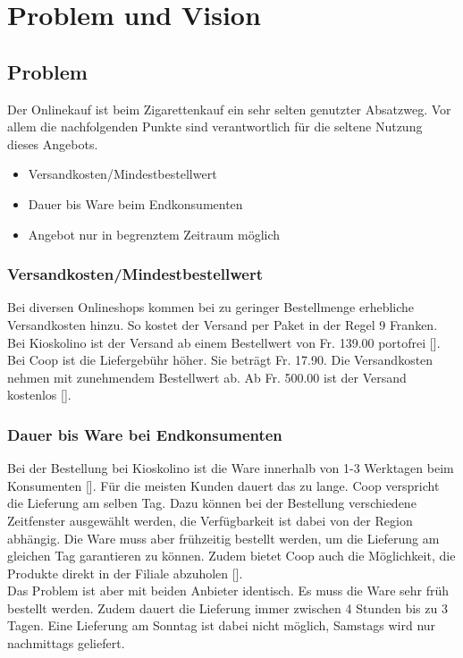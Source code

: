 \section{Problem und Vision}\label{Problem}
\subsection{Problem}
Der Onlinekauf ist beim Zigarettenkauf ein sehr selten genutzter Absatzweg. Vor allem die nachfolgenden Punkte sind verantwortlich für die seltene Nutzung dieses Angebots. 
\begin{itemize}
	\item Versandkosten/Mindestbestellwert
	\item Dauer bis Ware beim Endkonsumenten
	\item Angebot nur in begrenztem Zeitraum möglich
\end{itemize}

\subsubsection{Versandkosten/Mindestbestellwert}
Bei diversen Onlineshops kommen bei zu geringer Bestellmenge erhebliche Versandkosten hinzu. So kostet der Versand per Paket in der Regel 9 Franken. Bei Kioskolino ist der Versand ab einem Bestellwert von Fr. 139.00 portofrei [\cite{kioskolino}]. 
Bei Coop ist die Liefergebühr höher. Sie beträgt Fr. 17.90. Die Versandkosten nehmen mit zunehmendem Bestellwert ab. Ab Fr. 500.00 ist der Versand kostenlos [\cite{coop}]. 
\subsubsection{Dauer bis Ware bei Endkonsumenten}
Bei der Bestellung bei Kioskolino ist die Ware innerhalb von 1-3 Werktagen beim Konsumenten [\cite{kioskolino}]. Für die meisten Kunden dauert das zu lange. 
Coop verspricht die Lieferung am selben Tag. Dazu können bei der Bestellung verschiedene Zeitfenster ausgewählt werden, die Verfügbarkeit ist dabei von der Region abhängig. Die Ware muss aber frühzeitig bestellt werden, um die Lieferung am gleichen Tag garantieren zu können. Zudem bietet Coop auch die Möglichkeit, die Produkte direkt in der Filiale abzuholen [\cite{coop}].\\
Das Problem ist aber mit beiden Anbieter identisch. Es muss die Ware sehr früh bestellt werden. Zudem dauert die Lieferung immer zwischen 4 Stunden bis zu 3 Tagen. Eine Lieferung am Sonntag ist dabei nicht möglich, Samstags wird nur nachmittags geliefert. 

